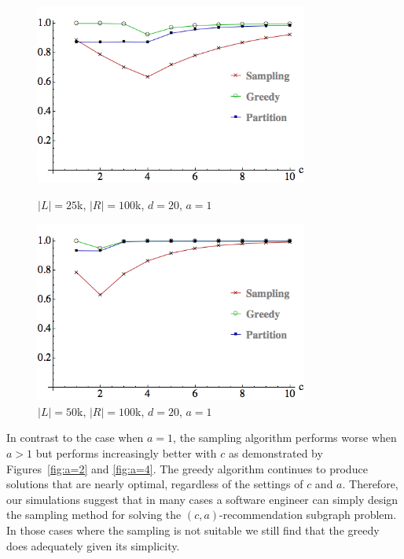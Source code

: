 \begin{figure}[t]
\centering
\begin{minipage}[h]{0.48\textwidth}
\centering
\includegraphics[width=0.8\textwidth]{images/l=25000,r=100000_Greedy_vs_Naive.png}
\caption{$|L|=25$k, $|R|=100$k, $d=20$, $a=1$}\label{fig:a=1:1}
\end{minipage}
\hspace{0cm}
\begin{minipage}[h]{0.48\textwidth}
\centering
\includegraphics[width=0.8\textwidth]{images/l=50000,r=100000_Greedy_vs_Naive.png}
\caption{$|L|=50$k, $|R|=100$k, $d=20$, $a=1$}\label{fig:a=1:2}
\end{minipage}
\vspace{-0.2in}
\end{figure}



In contrast to the case when $a=1$, the sampling algorithm performs
worse when $a>1$ but performs increasingly better with $c$ as
demonstrated by Figures~\ref{fig:a=2} and \ref{fig:a=4}. The greedy
algorithm continues to produce solutions that are nearly optimal,
regardless of the settings of $c$ and $a$. Therefore, our simulations
suggest that in many cases a software engineer can simply design the
sampling method for solving the $(c, a)$-recommendation subgraph
problem. In those cases where the sampling is not suitable we still
find that the greedy does adequately given its simplicity.

